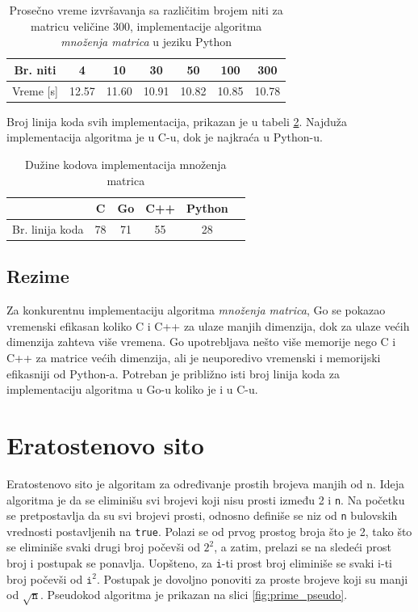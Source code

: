 \documentclass[12pt,oneside]{memoir}
\begin{document}
\begin{table}
\begin{center}
\caption{Prosečno vreme izvršavanja sa različitim brojem niti  za matricu veličine 300, implementacije algoritma \textit{množenja matrica} u jeziku Python}
\begin{tabular}{||c||c|c|c|c|c|c||}
\hline
Br. niti &4 &10 &30 &50 &100 & 300  \\ \hline
Vreme [s]	&12.57	&11.60	&10.91	 & 10.82	&10.85	&10.78\\ \hline
\end{tabular}
\label{tab:matrix111}
\end{center}
\end{table}


Broj linija koda svih  implementacija, prikazan je u tabeli \ref{tab:matrix2}. Najduža implementacija algoritma je u C-u, dok je najkraća u Python-u.
\begin{table}
\begin{center}
\caption{Dužine kodova implementacija množenja matrica}
\begin{tabular}{|c|c|c|c|c|c|}
\hline
		&  C 	& Go	& C++	& Python	\\ \hline
Br. linija koda& 78	& 71	&55		&28		\\ \hline
\end{tabular}
\label{tab:matrix2}
\end{center}
\end{table}

\subsection{Rezime}

Za konkurentnu implementaciju algoritma \textit{množenja matrica}, Go se pokazao vremenski efikasan koliko C i C++ za ulaze manjih dimenzija, dok za ulaze većih dimenzija zahteva više vremena. Go upotrebljava nešto više memorije nego C i C++ za matrice većih dimenzija, ali je neuporedivo vremenski i memorijski efikasniji od Python-a. Potreban je približno isti broj linija koda za implementaciju algoritma u Go-u koliko je i u C-u.


\section{Eratostenovo sito} \label{erathost}
Eratostenovo sito je algoritam za određivanje prostih brojeva manjih od n. Ideja algoritma je da se eliminišu svi brojevi koji nisu prosti između 2 i \texttt{n}. Na početku se pretpostavlja da su svi brojevi prosti, odnosno definiše se niz od \texttt{n} bulovskih vrednosti postavljenih na \texttt{true}. Polazi se od prvog prostog broja što je 2, tako što se eliminiše svaki drugi broj počevši od $2^{2}$, a zatim, prelazi se na sledeći prost broj i postupak se ponavlja. Uopšteno, za \texttt{i}-ti prost broj eliminiše se svaki i-ti broj počevši od  $\texttt{i}^{2}$. Postupak je dovoljno ponoviti za proste brojeve koji su manji od $\sqrt{\texttt{n}}$. Pseudokod algoritma je prikazan na slici \ref{fig:prime_pseudo}.
\end{document}
